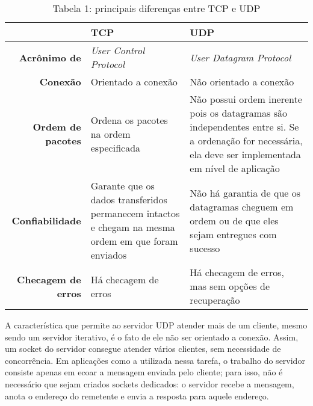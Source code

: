 \documentclass[a4paper,10pt]{article}
\begin{document}
\begin{table}[h]
\centering
\caption{Tabela 1: principais diferenças entre TCP e UDP}
\label{tab1}
\begin{tabularx}{\textwidth}{rXX}
\multicolumn{1}{l}{}       & \textbf{TCP}                                                                                        & \textbf{UDP}                                                                                                                                            \\ \hline
\textbf{Acrônimo de}       & \textit{User Control Protocol}                                                                      & \textit{User Datagram Protocol}                                                                                                                         \\ \hline
\textbf{Conexão}           & Orientado a conexão                                                                                 & Não orientado a conexão                                                                                                                                 \\ \hline
\textbf{Ordem de pacotes}  & Ordena os pacotes na ordem especificada                                                             & Não possui ordem inerente pois os datagramas são independentes entre si. Se a ordenação for necessária, ela deve ser implementada em nível de aplicação \\ \hline
\textbf{Confiabilidade}    & Garante que os dados transferidos permanecem intactos e chegam na mesma ordem em que foram enviados & Não há garantia de que os datagramas cheguem em ordem ou de que eles sejam entregues com sucesso                                                        \\ \hline
\textbf{Checagem de erros} & Há checagem de erros                                                                                & Há checagem de erros, mas sem opções de recuperação                                                                                                    
\end{tabularx}
\end{table}

A característica que permite ao servidor UDP atender mais de um cliente, mesmo sendo um servidor iterativo, é o fato de ele não ser orientado a conexão. Assim, um socket do servidor consegue atender vários clientes, sem necessidade de concorrência. Em aplicações como a utilizada nessa tarefa, o trabalho do servidor consiste apenas em ecoar a mensagem enviada pelo cliente; para isso, não é necessário que sejam criados sockets dedicados: o servidor recebe a mensagem, anota o endereço do remetente e envia a resposta para aquele endereço.
\end{document}
